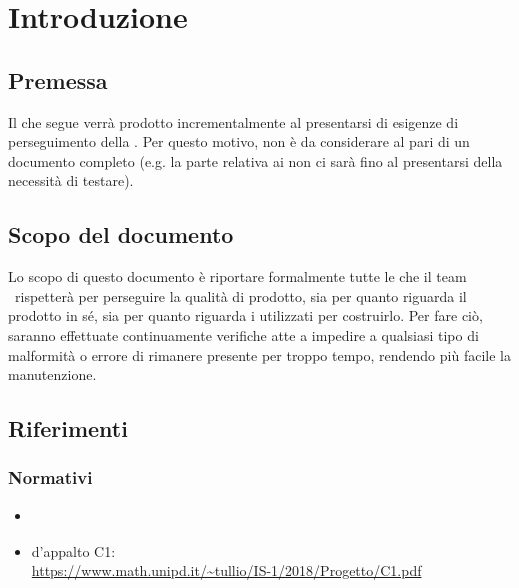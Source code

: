 \section{Introduzione}\label{introduzione}

    

    \subsection{Premessa}
    Il  che segue verrà prodotto incrementalmente al presentarsi di esigenze di perseguimento della .
    Per questo motivo, non è da considerare al pari di un documento completo (e.g. la parte relativa ai non ci sarà fino
    al presentarsi della necessità di testare).

    \subsection{Scopo del documento}
    Lo scopo di questo documento è riportare formalmente tutte le  che il team \gruppo\ rispetterà per perseguire
    la qualità di prodotto, sia per quanto riguarda il prodotto in s\'e, sia per quanto riguarda i 
    utilizzati per costruirlo. Per fare ciò, saranno effettuate continuamente verifiche atte a impedire a qualsiasi tipo di malformità o errore
    di rimanere presente per troppo tempo, rendendo più facile la manutenzione.

    

    \subsection{Riferimenti}
	
	\subsubsection{Normativi}
    \begin{itemize}
    	\item \textit{\NdPv}
    	\item {} d'appalto C1:\\ \url{https://www.math.unipd.it/~tullio/IS-1/2018/Progetto/C1.pdf}
    \end{itemize}
    

